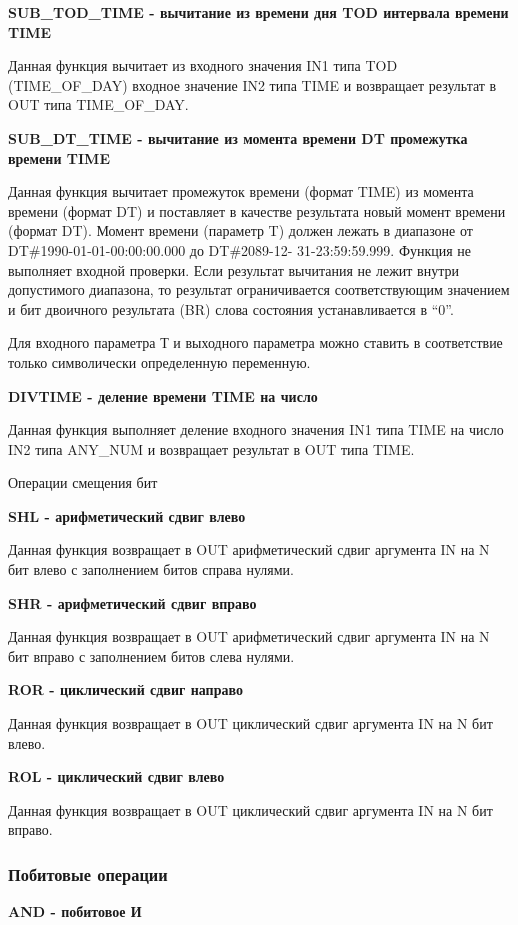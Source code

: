 \documentclass[letterpaper,10pt,russian]{sphinxmanual}
\begin{document}
\textbf{SUB\_TOD\_TIME - вычитание из времени дня TOD интервала времени TIME}

Данная функция вычитает из входного значения IN1 типа TOD (TIME\_OF\_DAY)
входное значение IN2 типа TIME и возвращает результат в OUT типа
TIME\_OF\_DAY.

\textbf{SUB\_DT\_TIME - вычитание из момента времени DT промежутка времени TIME}

Данная функция вычитает промежуток времени (формат TIME) из момента
времени (формат DT) и поставляет в качестве результата новый момент
времени (формат DT). Момент времени (параметр T) должен лежать в
диапазоне от DT\#1990-01-01-00:00:00.000 до DT\#2089-12- 31-23:59:59.999.
Функция не выполняет входной проверки. Если результат вычитания не лежит
внутри допустимого диапазона, то результат ограничивается
соответствующим значением и бит двоичного результата (BR) слова
состояния устанавливается в ``0''.

Для входного параметра Т и выходного параметра можно ставить в
соответствие только символически определенную переменную.

\textbf{DIVTIME - деление времени TIME на число}

Данная функция выполняет деление входного значения IN1 типа TIME на
число IN2 типа ANY\_NUM и возвращает результат в OUT типа TIME.

Операции смещения бит

\textbf{SHL - арифметический сдвиг влево}

Данная функция возвращает в OUT арифметический сдвиг аргумента IN на N
бит влево с заполнением битов справа нулями.

\textbf{SHR - арифметический сдвиг вправо}

Данная функция возвращает в OUT арифметический сдвиг аргумента IN на N
бит вправо с заполнением битов слева нулями.

\textbf{ROR - циклический сдвиг направо}

Данная функция возвращает в OUT циклический сдвиг аргумента IN на N бит
влево.

\textbf{ROL - циклический сдвиг влево}

Данная функция возвращает в OUT циклический сдвиг аргумента IN на N бит
вправо.


\subsubsection{Побитовые операции}
\label{usage_guide/library:id6}
\textbf{AND - побитовое И}
\end{document}
